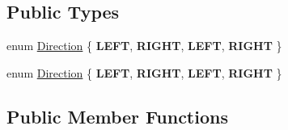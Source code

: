 \subsection*{Public Types}
\begin{DoxyCompactItemize}
\item 
enum \hyperlink{classui_1_1LoadingBar_a4407b3ce72891a78755e25d765e25063}{Direction} \{ {\bfseries L\+E\+FT}, 
{\bfseries R\+I\+G\+HT}, 
{\bfseries L\+E\+FT}, 
{\bfseries R\+I\+G\+HT}
 \}
\item 
enum \hyperlink{classui_1_1LoadingBar_a4407b3ce72891a78755e25d765e25063}{Direction} \{ {\bfseries L\+E\+FT}, 
{\bfseries R\+I\+G\+HT}, 
{\bfseries L\+E\+FT}, 
{\bfseries R\+I\+G\+HT}
 \}
\end{DoxyCompactItemize}
\subsection*{Public Member Functions}
